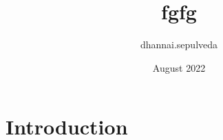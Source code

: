 \documentclass{article}
\title{fgfg}
\author{dhannai.sepulveda }
\date{August 2022}
\begin{document}
\maketitle
\tableofcontents
\section{Introduction}

\cite{dussaillant2009}

\printbibliography
\end{document}
